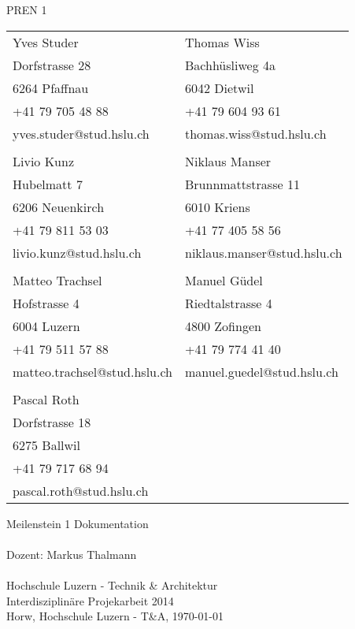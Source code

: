 \begin{titlepage}
    \parindent0pt {\Huge PREN 1}\\
    \vspace*{0.7cm}
    \newline
    \begin{tabular}{ p{6cm} p{5cm}}
        Yves Studer                & Thomas Wiss \\
        Dorfstrasse 28             & Bachhüsliweg 4a \\
        6264 Pfaffnau              & 6042 Dietwil \\
        +41 79 705 48 88           & +41 79 604 93 61 \\
        yves.studer@stud.hslu.ch   & thomas.wiss@stud.hslu.ch \\
                                   & \\
        Livio Kunz                 & Niklaus Manser \\
        Hubelmatt 7                 & Brunnmattstrasse 11\\
        6206 Neuenkirch         & 6010 Kriens \\
        +41 79 811 53 03           & +41 77 405 58 56 \\
        livio.kunz@stud.hslu.ch    & niklaus.manser@stud.hslu.ch \\
                                   & \\
        Matteo Trachsel			   & Manuel Güdel \\
        Hofstrasse 4               & Riedtalstrasse 4\\
        6004 Luzern                & 4800 Zofingen\\
        +41 79 511 57 88           & +41 79 774 41 40 \\
        matteo.trachsel@stud.hslu.ch & manuel.guedel@stud.hslu.ch \\
        						   & \\
        Pascal Roth			       & \\
        Dorfstrasse 18			   & \\
        6275 Ballwil		       & \\
        +41 79 717 68 94	       & \\
        pascal.roth@stud.hslu.ch   & \\
    \end{tabular}
    \vspace*{1.7cm}
    \newline
    {\Huge Meilenstein 1 Dokumentation}\\
    \vspace*{1.2cm}\\
    {\normalsize Dozent: Markus Thalmann}\\
    \vspace*{0.2cm}\\
    {\normalsize Hochschule Luzern - Technik \& Architektur}\\
    {\normalsize Interdisziplinäre Projekarbeit 2014}\\
    \vspace*{2.3cm}
    \newline
    {\normalsize Horw, Hochschule Luzern - T\&A, \today}\\
\end{titlepage}
